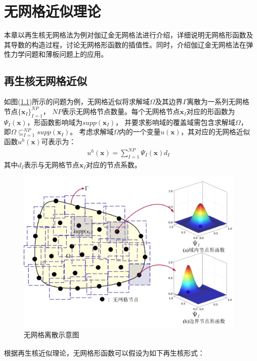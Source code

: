 \chapter{无网格近似理论}
本章以再生核无网格法为例对伽辽金无网格法进行介绍，详细说明无网格形函数及其导数的构造过程，讨论无网格形函数的插值性。同时，介绍伽辽金无网格法在弹性力学问题和薄板问题上的应用。
\section{再生核无网格近似}
如图(\ref{nomeshpoint})所示的问题为例，无网格近似将求解域$\Omega$及其边界$\Gamma$离散为一系列无网格节点$\{\pmb{x}_I\}^{N\!P}_{I=1}$，
$N\!P$表示无网格节点数量。每个无网格节点$\pmb{x}_I$对应的形函数为$\Psi_I(\pmb{x})$，形函数影响域为$supp(\pmb{x}_I)$，
并要求影响域的覆盖域需包含求解域$\Omega$，即$\Omega\subseteq^{N\!P}_{I=1}supp(\pmb{x}_I)$。
考虑求解域$\Omega$内的一个变量$u(\pmb{x})$，其对应的无网格近似函数$u^h(\pmb{x})$可表示为：
\begin{equation}\label{ui}
\begin{split}
    u^h(\pmb{x})=\sum_{I=1}^{N\!P}\Psi_I(\pmb{x})d_{I}
\end{split}
\end{equation}
其中$d_{I}$表示与无网格节点$\pmb{x}_I$对应的节点系数。\par
\begin{figure}[H]
\centering
    \includegraphics[scale=0.6]{Figure/nomesh/point.png}
    \caption{无网格离散示意图}\label{nomeshpoint}
\end{figure}\par
根据再生核近似理论\textsuperscript{\cite{liuReproducingKernelParticle1995}}，无网格形函数可以假设为如下再生核形式：
